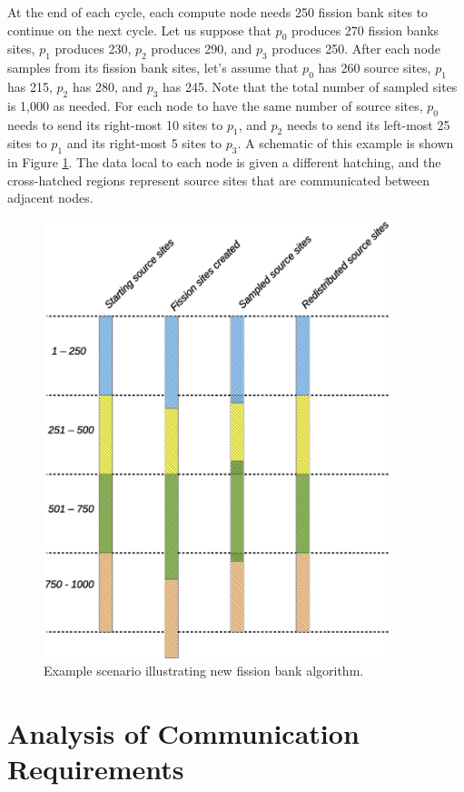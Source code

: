 At the end of each cycle, each compute node needs 250 fission bank
sites to continue on the next cycle. Let us suppose that $p_0$
produces 270 fission banks sites, $p_1$ produces 230, $p_2$ produces
290, and $p_3$ produces 250. After each node samples from its fission
bank sites, let's assume that $p_0$ has 260 source sites, $p_1$ has
215, $p_2$ has 280, and $p_3$ has 245. Note that the total number of
sampled sites is 1,000 as needed. For each node to have the same number
of source sites, $p_0$ needs to send its right-most 10 sites to $p_1$,
and $p_2$ needs to send its left-most 25 sites to $p_1$ and its
right-most 5 sites to $p_3$. A schematic of this example is shown in
Figure \ref{fig:algorithm-new}. The data local to each node is given a
different hatching, and the cross-hatched regions represent source
sites that are communicated between adjacent nodes.
\begin{figure}[h!]
  \centering
  \includegraphics[width=0.9\textwidth]{figures/algorithm_schematic/algorithm-new.eps}
  \caption{Example scenario illustrating new fission bank algorithm.}
  \label{fig:algorithm-new}
\end{figure}

\section{Analysis of Communication Requirements}
\label{sec:analysis}

